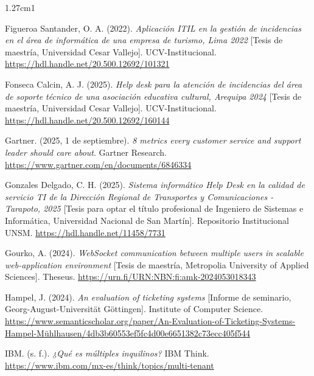 \begin{hangparas}{1.27cm}{1}
\vspace{0.8em}

Figueroa Santander, O. A. (2022). \textit{Aplicación ITIL en la gestión de incidencias en el área de informática de una empresa de turismo, Lima 2022} [Tesis de maestría, Universidad Cesar Vallejo]. UCV-Institucional. \url{https://hdl.handle.net/20.500.12692/101321}

\vspace{0.8em}

Fonseca Calcin, A. J. (2025). \textit{Help desk para la atención de incidencias del área de soporte técnico de una asociación educativa cultural, Arequipa 2024} [Tesis de maestría, Universidad Cesar Vallejo]. UCV-Institucional. \url{https://hdl.handle.net/20.500.12692/160144}

\vspace{0.8em}

Gartner. (2025, 1 de septiembre). \textit{8 metrics every customer service and support leader should care about}. Gartner Research. \url{https://www.gartner.com/en/documents/6846334}

\vspace{0.8em}

Gonzales Delgado, C. H. (2025). \textit{Sistema informático Help Desk en la calidad de servicio TI de la Dirección Regional de Transportes y Comunicaciones - Tarapoto, 2025} [Tesis para optar el título profesional de Ingeniero de Sistemas e Informática, Universidad Nacional de San Martín]. Repositorio Institucional UNSM. \url{https://hdl.handle.net/11458/7731}

\vspace{0.8em}

Gourko, A. (2024). \textit{WebSocket communication between multiple users in scalable web-application environment} [Tesis de maestría, Metropolia University of Applied Sciences]. Theseus. \url{https://urn.fi/URN:NBN:fi:amk-2024053018343}

\vspace{0.8em}

Hampel, J. (2024). \textit{An evaluation of ticketing systems} [Informe de seminario, Georg-August-Universität Göttingen]. Institute of Computer Science. \url{https://www.semanticscholar.org/paper/An-Evaluation-of-Ticketing-Systems-Hampel-Mühlhausen/4db3b60553ef5fc4d00e6651382c73ecc405f544}

\vspace{0.8em}

IBM. (s. f.). \textit{¿Qué es múltiples inquilinos?} IBM Think. \url{https://www.ibm.com/mx-es/think/topics/multi-tenant}


\end{hangparas}

